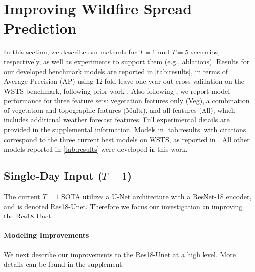 \section{Improving Wildfire Spread Prediction}
\label{sec:experiments}

In this section, we describe our methods for $T=1$ and $T=5$ scenarios, respectively, as well as experiments to support them (e.g., ablations). Results for our developed benchmark models are reported in \cref{tab:results}, in terms of Average Precision (AP) using 12-fold leave-one-year-out cross-validation on the WSTS benchmark, following prior work \cite{gerard2023wildfirespreadts}. Also following \cite{gerard2023wildfirespreadts}, we report model performance for three feature sets: vegetation features only (Veg), a combination of vegetation and topographic features (Multi), and all features (All), which includes additional weather forecast features.  Full experimental details are provided in the supplemental information.  Models in \cref{tab:results} with citations correspond to the three current best models on WSTS, as reported in \cite{gerard2023wildfirespreadts}. All other models reported in \cref{tab:results} were developed in this work. 


\subsection{Single-Day Input ($T=1$)}
\label{sec:results_single_day_input}

The current $T=1$ SOTA utilizes a U-Net architecture with a ResNet-18 encoder, and is denoted Res18-Unet\cite{gerard2023wildfirespreadts}. Therefore we focus our investigation on improving the Res18-Unet\cite{gerard2023wildfirespreadts}.     

\paragraph{Modeling Improvements} We next describe our improvements to the Res18-Unet\cite{gerard2023wildfirespreadts} at a high level.  More details can be found in the supplement. 

